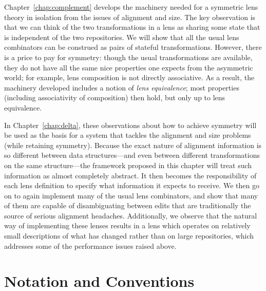 Chapter~\ref{chap:complement} develops the machinery needed for a symmetric
lens theory in isolation from the issues of alignment and size. The key
observation is that we can think of the two transformations in a lens as
sharing some state that is independent of the two repositories. We will show
that all the usual lens combinators can be construed as pairs of stateful
transformations. However, there is a price to pay for symmetry: though the
usual transformations are available, they do not have all the same nice
properties one expects from the asymmetric world; for example, lens
composition is not directly associative. As a result, the machinery
developed includes a notion of \emph{lens equivalence}; most properties
(including associativity of composition) then hold, but only up to lens
equivalence.

In Chapter~\ref{chap:delta}, these observations about how to achieve
symmetry will be used as the basis for a system that tackles the alignment
and size problems (while retaining symmetry). Because the exact nature of
alignment information is so different between data structures---and even
between different transformations on the same structure---the framework
proposed in this chapter will treat such information as almost completely
abstract. It then becomes the responsibility of each lens definition to
specify what information it expects to receive. We then go on to again
implement many of the usual lens combinators, and show that many of them are
capable of disambiguating between edits that are traditionally the source of
serious alignment headaches. Additionally, we observe that the natural way
of implementing these lenses results in a lens which operates on relatively
small descriptions of what has changed rather than on large repositories,
which addresses some of the performance issues raised above.


\section{Notation and Conventions}
\label{sec:notation}
